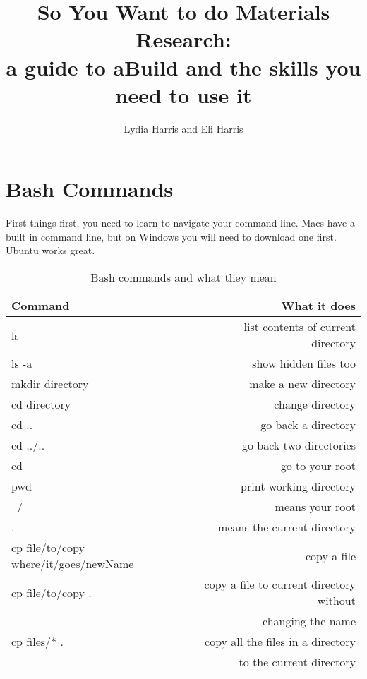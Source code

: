 \documentclass{article}
\title{So You Want to do Materials Research:\\[0.02em]\smaller{}a
guide to aBuild and the skills you need to use it}
\author{Lydia Harris and Eli Harris}
\begin{document}
\maketitle

\section{Bash Commands}

First things first, you need to learn to navigate your command
line. Macs have a built in command line, but on Windows you will need
to download one first. Ubuntu works great.

\begin{table}
        \begin{center}
                \caption{Bash commands and what they mean}
                \label{bashcommands}
                \begin{tabular}{l|r}
                        \textbf{Command} & \textbf{What it does}\\
                        \hline
                        ls & list contents of current directory \\
                        ls -a & show hidden files too \\
                        mkdir directory & make a new directory \\
                        cd directory & change directory \\
                        cd .. & go back a directory \\
                        cd ../.. & go back two directories \\
                        cd ~ & go to your root \\
                        pwd & print working directory \\
                        ~/ & means your root \\
                        . & means the current directory \\
                        cp file/to/copy where/it/goes/newName & copy
                        a file \\
                        cp file/to/copy . & copy a file to current
                        directory without \\
                         & changing the name \\
                        cp files/* . & copy all the files in a
                        directory \\
                         & to the current directory \\

\end{tabular}
\end{center}
\end{table}
\end{document}
